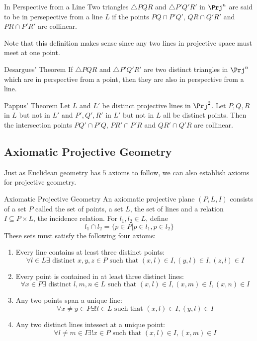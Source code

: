 \documentclass[a4paper]{article}
\begin{document}
\begin{defn}{In Perspective from a Line}{} Two triangles $\triangle PQR$ and $\triangle P'Q'R'$ in $\Prj^n$ are said to be in persepective from a line $L$ if the points $PQ\cap P'Q'$, $QR\cap Q'R'$ and $PR\cap P'R'$ are collinear. 
\end{defn}

Note that this definition makes sense since any two lines in projective space must meet at one point. 

\begin{thm}{Desargues' Theorem}{} If $\triangle PQR$ and $\triangle P'Q'R'$ are two distinct triangles in $\Prj^n$ which are in perspective from a point, then they are also in perspective from a line. 
\end{thm}

\begin{thm}{Pappus' Theorem}{} Let $L$ and $L'$ be distinct projective lines in $\Prj^2$. Let $P,Q,R$ in $L$ but not in $L'$ and $P',Q',R'$ in $L'$ but not in $L$ all be distinct points. Then the intersection points $PQ'\cap P'Q$, $PR'\cap P'R$ and $QR'\cap Q'R$ are collinear. 
\end{thm}

\subsection{Axiomatic Projective Geometry}
Just as Euclidean geometry has $5$ axioms to follow, we can also establish axioms for projective geometry. 

\begin{defn}{Axiomatic Projective Geometry}{} An axiomatic projective plane $(P,L,I)$ consists of a set $P$ called the set of points, a set $L$, the set of lines and a relation $I\subseteq P\times L$, the incidence relation. For $l_1,l_2\in L$, define $$l_1\cap l_2=\{p\in P|p\in l_1, p\in l_2\}$$ These sets must satisfy the following four axioms:
\begin{enumerate}
\item Every line contains at least three distinct points: $$\forall l\in L\exists\text{ distinct }x,y,z\in P\text{ such that }(x,l)\in I, (y,l)\in I, (z,l)\in I$$
\item Every point is contained in at least three distinct lines: $$\forall x\in P\exists\text{ distinct }l,m,n\in L\text{ such that }(x,l)\in I, (x,m)\in I, (x,n)\in I$$
\item Any two points span a unique line: $$\forall x\neq y\in P\exists!l\in L\text{ such that }(x,l)\in I, (y,l)\in I$$
\item Any two distinct lines intesect at a unique point: $$\forall l\neq m\in I\exists!x\in P\text{ such that }(x,l)\in I, (x,m)\in I$$
\end{enumerate}
\end{defn}
\end{document}
